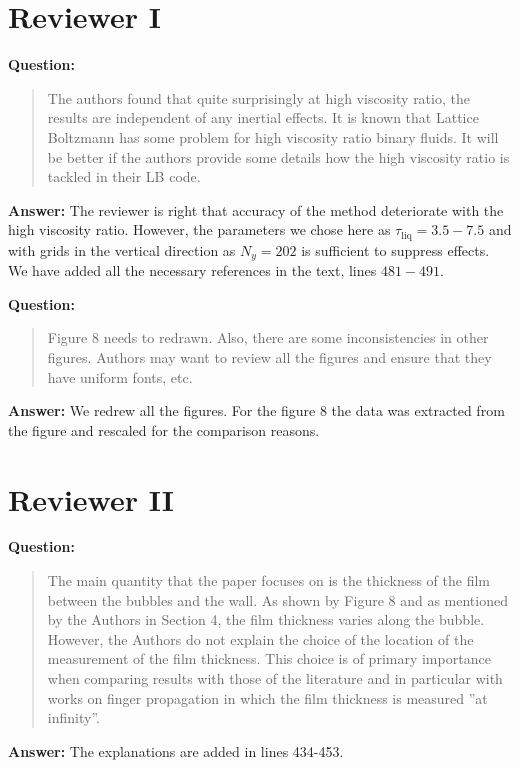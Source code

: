 \documentclass{article}
\begin{document}
\section{Reviewer I}

\textbf{Question:}
\begin{quotation}
The authors found that quite surprisingly at high viscosity ratio, the results are
independent of any inertial effects. It is known that Lattice Boltzmann has some problem for high
viscosity ratio binary fluids. It will be better if the authors provide some details how the high
viscosity ratio is tackled in their LB code.
\end{quotation}

\textbf{Answer:} The reviewer is right that accuracy of the method deteriorate with the high
viscosity ratio. However, the parameters we chose here as $\tau_{\mathrm{liq}}=3.5-7.5$ and with
grids in the vertical direction as $N_y=202$ is sufficient to suppress effects. We have added all
the necessary references in the text, lines $481-491$.

\textbf{Question:}
\begin{quotation}
Figure 8 needs to redrawn. Also, there are some inconsistencies in other figures. Authors may
want to review all the figures and ensure that they have uniform fonts, etc.
\end{quotation}

\textbf{Answer:} We redrew all the figures. For the figure 8 the data was extracted from the
figure and rescaled for the comparison reasons.

\section{Reviewer II}

\textbf{Question:}
\begin{quotation}
The main quantity that the paper focuses on is the thickness of the film between the bubbles and the
wall. As shown by Figure 8 and as mentioned by the Authors in Section 4, the film thickness varies
along the bubble. However, the Authors do not explain the choice of the location of the measurement
of the film thickness. This choice is of primary importance when comparing results with those of
the
literature and in particular with works on finger propagation in which the film thickness is
measured
”at infinity”.
\end{quotation}

\textbf{Answer:} The explanations are added in lines 434-453.
 
\end{document}
